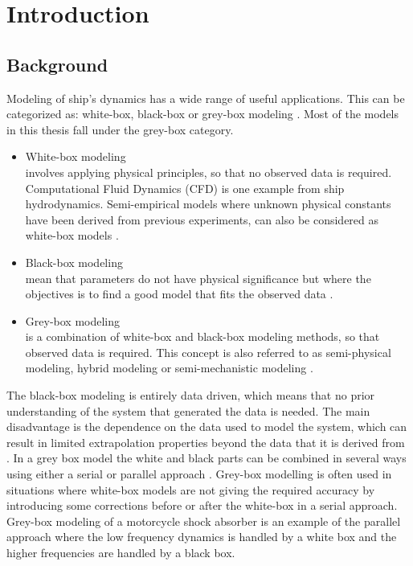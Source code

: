 \chapter{Introduction}
\section{Background}
Modeling of ship’s dynamics has a wide range of useful applications. This can be categorized as: white-box, black-box or grey-box modeling \cite{leifsson_grey-box_2008}. Most of the models in this thesis fall under the grey-box category.

\begin{itemize}
    \item White-box modeling \\
    involves applying physical principles, so that no observed data is required. Computational Fluid Dynamics (CFD) is one example from ship hydrodynamics. Semi-empirical models where unknown physical constants have been derived from previous experiments, can also be considered as white-box models \cite{leifsson_grey-box_2008}.  

    \item Black-box modeling \\
    mean that parameters do not have physical significance but where the objectives is to find a good model that fits the observed data \cite{lindskog_tools_1995}.
    
    \item Grey-box modeling \\
    is a combination of white-box and black-box modeling methods, so that observed data is required. This concept is also referred to as semi-physical modeling, hybrid modeling or semi-mechanistic modeling \cite{leifsson_grey-box_2008}. 
\end{itemize}

The black-box modeling is entirely data driven, which means that no prior understanding of the system that generated the data is needed. The main disadvantage is the dependence on the data used to model the system, which can result in limited extrapolation properties beyond the data that it is derived from \cite{leifsson_grey-box_2008}. 
In a grey box model the white and black parts can be combined in several ways using either a serial or parallel approach \cite{leifsson_grey-box_2008}. 
Grey-box modelling is often used in situations where white-box models are not giving the required accuracy by introducing some corrections before or after the white-box in a serial approach. 
Grey-box modeling of a motorcycle shock absorber \cite{beghi_grey-box_2007} is an example of the parallel approach where the low frequency dynamics is handled by a white box and the higher frequencies are handled by a black box.

